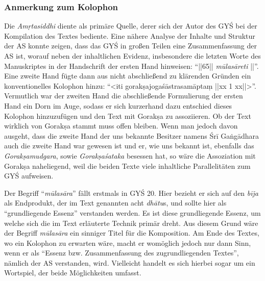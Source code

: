 \documentclass[a4paper,12pt]{article}
\begin{document}
{\subsubsection{Anmerkung zum Kolophon}
\label{mulariddle}
Die \textit{Amṛtasiddhi} diente als primäre Quelle, derer sich der Autor des GYŚ bei der Kompilation des Textes bediente. Eine nähere Analyse der Inhalte und Struktur der AS konnte zeigen, dass das GYŚ in großen Teilen eine Zusammenfassung der AS ist, worauf neben der inhaltlichen Evidenz, insbesondere die letzten Worte des Manuskriptes in der Handschrift der ersten Hand hinweisen: ``||65|| \textit{mūlasāreti} ||''. Eine zweite Hand fügte dann aus nicht abschließend zu klärenden Gründen ein konventionelles Kolophon hinzu: ``<iti gorakṣajogaśāstrasamāptaṃ ||xx 1 xx||>''. Vermutlich war der zweiten Hand die abschließende Formulierung der ersten Hand ein Dorn im Auge, sodass er sich kurzerhand dazu entschied dieses Kolophon hinzuzufügen und den Text mit Gorakṣa zu assoziieren. Ob der Text wirklich von Gorakṣa stammt muss offen bleiben. Wenn man jedoch davon ausgeht, dass die zweite Hand der uns bekannte Besitzer namens Śrī Gaṅgādhara auch die zweite Hand war gewesen ist und er, wie uns bekannt ist, ebenfalls das \textit{Gorakṣamudgara}, sowie \textit{Gorakṣaśataka} besessen hat, so wäre die Assoziation mit Gorakṣa naheliegend, weil die beiden Texte viele inhaltliche Parallelitäten zum GYŚ aufweisen.

Der Begriff ``\textit{mūlasāra}'' fällt erstmals in GYŚ 20. Hier bezieht er sich auf den \textit{bīja} als Endprodukt, der im Text genannten acht \textit{dhātu}s, und sollte hier als ``grundliegende Essenz'' verstanden werden. Es ist diese grundliegende Essenz, um welche sich die im Text erläuterte Technik primär dreht. Aus diesem Grund wäre der Begriff \textit{mūlasāra} ein sinniger Titel für die Komposition. Am Ende des Textes, wo ein Kolophon zu erwarten wäre, macht er womöglich jedoch nur dann Sinn, wenn er als ``Essenz bzw. Zusammenfassung des zugrundliegenden Textes'', nämlich der AS verstanden, wird. Vielleicht handelt es sich hierbei sogar um ein Wortspiel, der beide Möglichkeiten umfasst.

}
\end{document}

